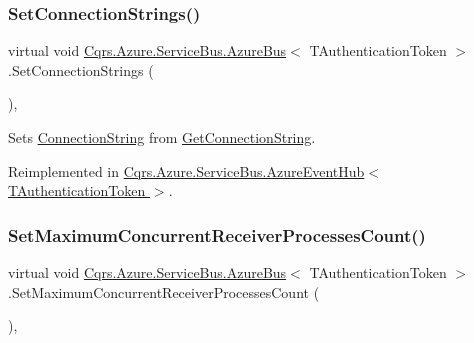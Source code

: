 \subsubsection{\texorpdfstring{Set\+Connection\+Strings()}{SetConnectionStrings()}}
{\footnotesize\ttfamily virtual void \hyperlink{classCqrs_1_1Azure_1_1ServiceBus_1_1AzureBus}{Cqrs.\+Azure.\+Service\+Bus.\+Azure\+Bus}$<$ T\+Authentication\+Token $>$.Set\+Connection\+Strings (\begin{DoxyParamCaption}{ }\end{DoxyParamCaption})\hspace{0.3cm}{\ttfamily [protected]}, {\ttfamily [virtual]}}



Sets \hyperlink{classCqrs_1_1Azure_1_1ServiceBus_1_1AzureBus_aaccdbc8cd25d3ae4f1a2801d2ad02a96_aaccdbc8cd25d3ae4f1a2801d2ad02a96}{Connection\+String} from \hyperlink{classCqrs_1_1Azure_1_1ServiceBus_1_1AzureBus_a514e371d5ce093678365af31e6c274e3_a514e371d5ce093678365af31e6c274e3}{Get\+Connection\+String}. 



Reimplemented in \hyperlink{classCqrs_1_1Azure_1_1ServiceBus_1_1AzureEventHub_af823e573f3acc3fa9949969499309db1_af823e573f3acc3fa9949969499309db1}{Cqrs.\+Azure.\+Service\+Bus.\+Azure\+Event\+Hub$<$ T\+Authentication\+Token $>$}.

\mbox{\label{classCqrs_1_1Azure_1_1ServiceBus_1_1AzureBus_a60cbe46aa3e60528dbd7e07be5132132_a60cbe46aa3e60528dbd7e07be5132132}} 
\subsubsection{\texorpdfstring{Set\+Maximum\+Concurrent\+Receiver\+Processes\+Count()}{SetMaximumConcurrentReceiverProcessesCount()}}
{\footnotesize\ttfamily virtual void \hyperlink{classCqrs_1_1Azure_1_1ServiceBus_1_1AzureBus}{Cqrs.\+Azure.\+Service\+Bus.\+Azure\+Bus}$<$ T\+Authentication\+Token $>$.Set\+Maximum\+Concurrent\+Receiver\+Processes\+Count (\begin{DoxyParamCaption}{ }\end{DoxyParamCaption})\hspace{0.3cm}{\ttfamily [protected]}, {\ttfamily [virtual]}}



